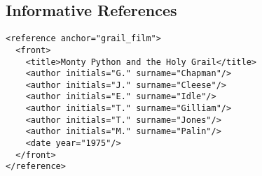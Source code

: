 \documentclass{metanorma}
\begin{document}
\subsection{Informative References}
\begin{thebibliography}{1}

\begin{verbatim}
<reference anchor="grail_film">
  <front>
    <title>Monty Python and the Holy Grail</title>
    <author initials="G." surname="Chapman"/>
    <author initials="J." surname="Cleese"/>
    <author initials="E." surname="Idle"/>
    <author initials="T." surname="Gilliam"/>
    <author initials="T." surname="Jones"/>
    <author initials="M." surname="Palin"/>
    <date year="1975"/>
  </front>
</reference>
\end{verbatim}


\end{thebibliography}

\end{document}
